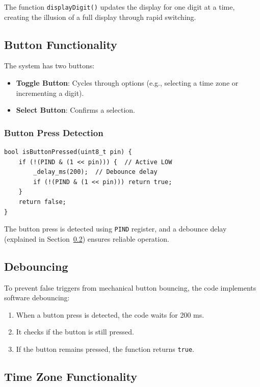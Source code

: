 \documentclass[journal]{IEEEtran}
\numberwithin{equation}{enumi}
\numberwithin{figure}{enumi}
\begin{document}
\noindent The function \texttt{displayDigit()} updates the display for one digit at a time, creating the illusion of a full display through rapid switching.

\subsection{Button Functionality}

The system has two buttons:
\begin{itemize}
    \item \textbf{Toggle Button}: Cycles through options (e.g., selecting a time zone or incrementing a digit).
    \item \textbf{Select Button}: Confirms a selection.
\end{itemize}

\subsubsection{Button Press Detection}
\begin{verbatim}
bool isButtonPressed(uint8_t pin) {
    if (!(PIND & (1 << pin))) {  // Active LOW
        _delay_ms(200);  // Debounce delay
        if (!(PIND & (1 << pin))) return true;
    }
    return false;
}
\end{verbatim}

\noindent The button press is detected using \texttt{PIND} register, and a debounce delay (explained in Section~\ref{sec:debouncing}) ensures reliable operation.

\subsection{Debouncing} \label{sec:debouncing}

To prevent false triggers from mechanical button bouncing, the code implements software debouncing:
\begin{enumerate}
    \item When a button press is detected, the code waits for 200 ms.
    \item It checks if the button is still pressed.
    \item If the button remains pressed, the function returns \texttt{true}.
\end{enumerate}

\subsection{Time Zone Functionality}
\end{document}
